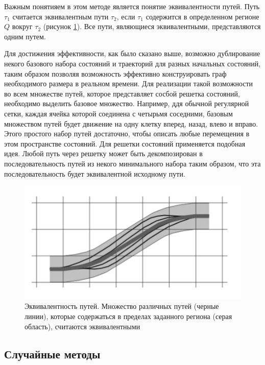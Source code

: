 Важным понятияем в этом методе является понятие эквивалентности путей. Путь $\tau_1$ считается эквивалентным пути
$\tau_2$, если $\tau_1$ содержится в определенном регионе $Q$ вокруг $\tau_2$ (рисунок \ref{img:lattice_path_eq}).
Все пути, являющиеся эквивалентными, представляются одним путем.

Для достижения эффективности, как было сказано выше, возможно дублирование некого базового набора состояний и траекторий
для разных начальных состояний, таким образом позволяя возможность эффективно конструировать граф необходимого размера
в реальном времени. Для реализации такой возможности во всем множестве путей, которое представляет сосбой решетка состояний,
необходимо выделить базовое множество. Например, ддя обычной регулярной сетки, каждая ячейка которой соединена с
четырьмя соседними, базовым множеством путей будет движение на одну клетку вперед, назад, влево и вправо. Этого простого
набор путей достаточно, чтобы описать любые перемещения в этом пространстве состояний. Для решетки состояний применяется
подобная идея. Любой путь через решетку может быть декомпозирован в последовательность путей из некого минимального
набора таким образом, что эта последовательность будет эквивалентной исходному пути.

\begin{figure}[h]
    \centering
    \includegraphics[]{images/lattice_path_eq}
    \caption{Эквивалентность путей. Множество различных путей (черные линии), которые содержаться в пределах заданного
             региона (серая область), считаются эквивалентными}
    \label{img:lattice_path_eq}
\end{figure}

\subsection{Случайные методы}

